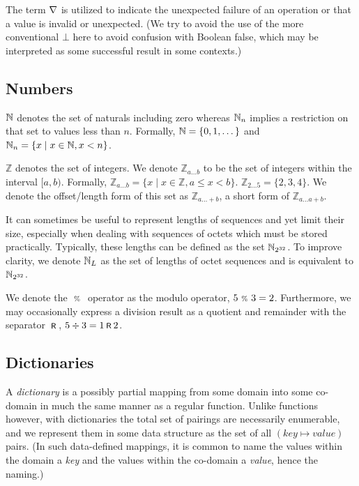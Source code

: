 The term $\nabla$ is utilized to indicate the unexpected failure of an operation or that a value is invalid or unexpected. (We try to avoid the use of the more conventional $\bot$ here to avoid confusion with Boolean false, which may be interpreted as some successful result in some contexts.)

\subsection{Numbers}\label{sec:numbers}

$\mathbb{N}$ denotes the set of naturals including zero whereas $\mathbb{N}_n$ implies a restriction on that set to values less than $n$. Formally, $\mathbb{N} = \{0, 1, \dots \}$ and $\mathbb{N}_n = \{ x \mid x \in \mathbb{N}, x < n \}$.

$\mathbb{Z}$ denotes the set of integers. We denote $\mathbb{Z}_{a \dots b}$ to be the set of integers within the interval $[a, b)$. Formally, $\mathbb{Z}_{a \dots b} = \{ x \mid x \in \mathbb{Z}, a \le x < b \}$. \Eg $\mathbb{Z}_{2 \dots 5} = \{ 2, 3, 4 \}$. We denote the offset/length form of this set as $\mathbb{Z}_{a \dots +b}$, a short form of $\mathbb{Z}_{a \dots a+b}$.

It can sometimes be useful to represent lengths of sequences and yet limit their size, especially when dealing with sequences of octets which must be stored practically. Typically, these lengths can be defined as the set $\mathbb{N}_{2^{32}}$. To improve clarity, we denote $\mathbb{N}_L$ as the set of lengths of octet sequences and is equivalent to $\mathbb{N}_{2^{32}}$.

We denote the $\ \text{\scriptsize{\%}}\ $ operator as the modulo operator, \eg $5 \ \text{\scriptsize{\%}}\  3 = 2$. Furthermore, we may occasionally express a division result as a quotient and remainder with the separator $\text{\hspace{2pt}\footnotesize{\textsf{R}}\hspace{2pt}}$, \eg $5 \div 3 = 1 \text{\hspace{2pt}\footnotesize{\textsf{R}}\hspace{2pt}} 2$.

\subsection{Dictionaries}\label{sec:dictionaries}

A \emph{dictionary} is a possibly partial mapping from some domain into some co-domain in much the same manner as a regular function. Unlike functions however, with dictionaries the total set of pairings are necessarily enumerable, and we represent them in some data structure as the set of all $(key \mapsto value)$ pairs. (In such data-defined mappings, it is common to name the values within the domain a \emph{key} and the values within the co-domain a \emph{value}, hence the naming.)

